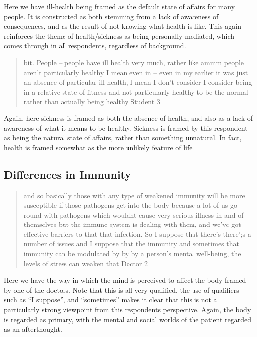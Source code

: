 Here we have ill-health being framed as the default state of affairs for many people. It is constructed as both stemming from a lack of awareness of consequences, and as the result of not knowing what health is like. This again reinforces the theme of health/sickness as being personally mediated, which comes through in all respondents, regardless of background. 

\begin{quotation}
  bit. People – people have ill health very much, rather like ammm people aren't particularly healthy I mean even in – even in my earlier it was just an absence of particular ill health, I mean I don't consider I consider being in a relative state of fitness and not particularly healthy to be the normal rather than actually being healthy 
Student 3
\end{quotation}

Again, here sickness is framed as both the absence of health, and also as a lack of awareness of what it means to be healthy. Sickness is framed by this respondent as being the natural state of affairs, rather than something unnatural. In fact, health is framed somewhat as the more unlikely feature of life. 

\subsection{Differences in Immunity}
\label{sec:differences-immunity}

\begin{quotation}
  and so basically those with any type of weakened immunity will be more susceptible if those pathogens get into the body because a lot of us go round with pathogens which wouldnt cause very serious illness in and of themselves but the immune system is dealing with them, and we've got effective barriers to that that infection. So I suppose that there's there';s a number of issues and I suppose that the immunity and sometimes that immunity can be modulated  by by by a person's mental well-being, the levels of stress can weaken that 
Doctor 2
\end{quotation}

Here we have the way in which the mind is perceived to affect the body framed by one of the doctors. Note that this is all very qualified, the use of qualifiers such as ``I suppose'', and ``sometimes'' makes it clear that this is not a particularly strong viewpoint from this respondents perspective. Again, the body is regarded as primary, with the mental and social worlds of the patient regarded as an afterthought. 


